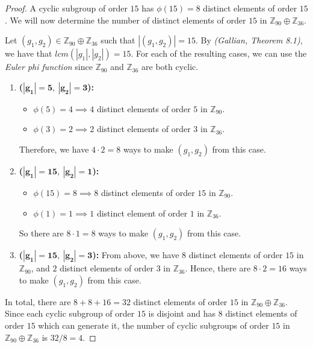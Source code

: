 \documentclass[12pt,reqno]{article}
\newcommand{\Z}{\mathbb{Z}}
\theoremstyle{plain}
\theoremstyle{definition}
\begin{document}
\begin{proof}
    A cyclic subgroup of order \(15\) has \(\phi(15)=8\) distinct elements of order \(15\).
    We will now determine the number of distinct elements of order \(15\) in \(\Z_{90}\oplus\Z_{36}\).
    
    Let \((g_1,g_2)\in\Z_{90}\oplus\Z_{36}\) such that \(|(g_1,g_2)|=15\).
    By \emph{(Gallian, Theorem 8.1)}, we have that \(lcm(|g_1|,|g_2|)=15\).
    For each of the resulting cases, we can use the \emph{Euler phi function} since \(\Z_{90}\) and
    \(\Z_{36}\) are both cyclic.
    \begin{enumerate}
        \item \textbf{(\(\mathbf{|g_1|=5,\ |g_2|=3}\)):} 
            \begin{itemize}
                \item \(\phi(5)=4\implies 4\) distinct elements of order
                \(5\) in \(\Z_{90}\).
                \item \(\phi(3)=2\implies 2\) distinct elements of order \(3\) in \(\Z_{36}\).
            \end{itemize}
            Therefore, we have \(4\cdot 2=8\) ways to make \((g_1,g_2)\) from this case.
        
        \item \textbf{(\(\mathbf{|g_1|=15,\ |g_2|=1}\)):} 
            \begin{itemize}
                \item \(\phi(15)=8\implies 8\) distinct elements of order
                \(15\) in \(\Z_{90}\).
                \item \(\phi(1)=1\implies 1\) distinct element of order \(1\) in \(\Z_{36}\).
            \end{itemize}
            So there are \(8\cdot 1=8\) ways to make \((g_1,g_2)\) from this case.
        
        \item \textbf{(\(\mathbf{|g_1|=15,\ |g_2|=3}\)):} 
            From above, we have \(8\) distinct elements of order
            \(15\) in \(\Z_{90}\), and \(2\) distinct elements of order \(3\) in \(\Z_{36}\).
            Hence, there are \(8\cdot 2=16\) ways to make \((g_1,g_2)\) from this case.
    \end{enumerate}
    In total, there are \(8+8+16=32\) distinct elements of order \(15\) in \(\Z_{90}\oplus\Z_{36}\). Since
    each cyclic subgroup of order \(15\) is disjoint and has \(8\) distinct elements of order \(15\)
    which can generate it, the number of cyclic subgroups of order \(15\) in \(\Z_{90}\oplus\Z_{36}\) is \(32/8=4\).
\end{proof}
\end{document}
